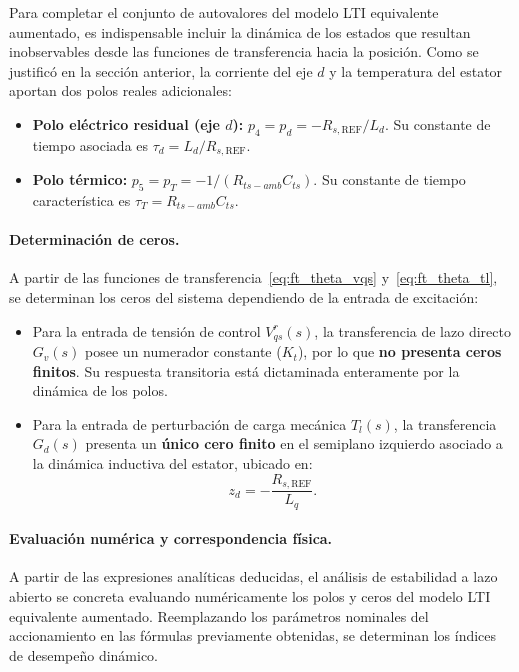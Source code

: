 \documentclass[10pt,a4paper]{article}
\begin{document}
Para completar el conjunto de autovalores del modelo LTI equivalente aumentado, es indispensable incluir la dinámica de los estados que resultan inobservables desde las funciones de transferencia hacia la posición. Como se justificó en la sección anterior, la corriente del eje $d$ y la temperatura del estator aportan dos polos reales adicionales:

\begin{itemize}
    \item \textbf{Polo eléctrico residual (eje $d$):} $p_4 = p_d = -R_{s,\mathrm{REF}}/L_d$. Su constante de tiempo asociada es $\tau_d = L_d / R_{s,\mathrm{REF}}$.
    \item \textbf{Polo térmico:} $p_5 = p_T = -1/(R_{ts-amb}C_{ts})$. Su constante de tiempo característica es $\tau_T = R_{ts-amb}C_{ts}$.
\end{itemize}

\paragraph{Determinación de ceros.}
A partir de las funciones de transferencia~\eqref{eq:ft_theta_vqs} y~\eqref{eq:ft_theta_tl}, se determinan los ceros del sistema dependiendo de la entrada de excitación:

\begin{itemize}
    \item Para la entrada de tensión de control $V_{qs}^r(s)$, la transferencia de lazo directo $G_v(s)$ posee un numerador constante ($K_t$), por lo que \textbf{no presenta ceros finitos}. Su respuesta transitoria está dictaminada enteramente por la dinámica de los polos.
    \item Para la entrada de perturbación de carga mecánica $T_l(s)$, la transferencia $G_d(s)$ presenta un \textbf{único cero finito} en el semiplano izquierdo asociado a la dinámica inductiva del estator, ubicado en:
    \begin{equation}
        z_d = -\frac{R_{s,\mathrm{REF}}}{L_q}.
    \end{equation}
\end{itemize}

\paragraph{Evaluación numérica y correspondencia física.}
A partir de las expresiones analíticas deducidas, el análisis de estabilidad a lazo abierto se concreta evaluando numéricamente los polos y ceros del modelo LTI equivalente aumentado. Reemplazando los parámetros nominales del accionamiento en las fórmulas previamente obtenidas, se determinan los índices de desempeño dinámico.
\end{document}
